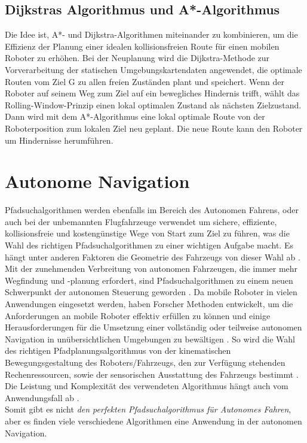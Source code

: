 \subsection{Dijkstras Algorithmus und A*-Algorithmus}

Die Idee ist, A*- und Dijkstra-Algorithmen miteinander zu kombinieren, um die Effizienz der Planung einer idealen kollisionsfreien Route für einen mobilen Roboter zu erhöhen. Bei der Neuplanung wird die Dijkstra-Methode zur Vorverarbeitung der statischen Umgebungskartendaten angewendet, die optimale Routen vom Ziel G zu allen freien Zuständen plant und speichert. Wenn der Roboter auf seinem Weg zum Ziel auf ein bewegliches Hindernis trifft, wählt das Rolling-Window-Prinzip einen lokal optimalen Zustand als nächsten Zielzustand. Dann wird mit dem A*-Algorithmus eine lokal optimale Route von der Roboterposition zum lokalen Ziel neu geplant.
Die neue Route kann den Roboter um Hindernisse herumführen\cite{Hong-mei17}.



\section{Autonome Navigation}
\label{Autonome Navigation}

Pfadsuchalgorithmen werden ebenfalls im Bereich des Autonomen Fahrens, oder auch bei der unbemannten Flugfahrzeuge verwendet
um sichere, effiziente, kollisionsfreie und kostengünstige Wege von Start zum Ziel zu führen, was die Wahl des richtigen Pfadsuchalgorithmen
zu einer wichtigen Aufgabe macht. Es hängt unter anderen Faktoren die Geometrie des Fahrzeugs von dieser Wahl ab \cite{Karur:21}.
Mit der zunehmenden Verbreitung von autonomen Fahrzeugen, die immer mehr Wegfindung und -planung erfordert, sind Pfadsuchalgorithmen
zu einem neuen Schwerpunkt der autonomen Steuerung geworden \cite{Karur:21}.
Da mobile Roboter in vielen Anwendungen eingesetzt werden, haben Forscher Methoden entwickelt, um die 
Anforderungen an mobile Roboter effektiv erfüllen zu können und einige Herausforderungen für die Umsetzung einer vollständig oder
teilweise autonomen Navigation in unübersichtlichen Umgebungen zu bewältigen \cite{Karur:21}.
So wird die Wahl des richtigen Pfadplanungsalgorithmus von der kinematischen Bewegungsgestaltung des Roboters/Fahrzeugs,
den zur Verfügung stehenden Rechenressourcen, sowie der sensorischen Ausstattung des Fahrzeugs bestimmt \cite{Karur:21}.\\
Die Leistung und Komplexität des verwendeten Algorithmus hängt auch vom Anwendungsfall ab \cite{Karur:21}. \\
Somit gibt es nicht \emph{den perfekten Pfadsuchalgorithmus für Autonomes Fahren}, aber es finden viele verschiedene Algorithmen eine 
Anwendung in der autonomen Navigation.